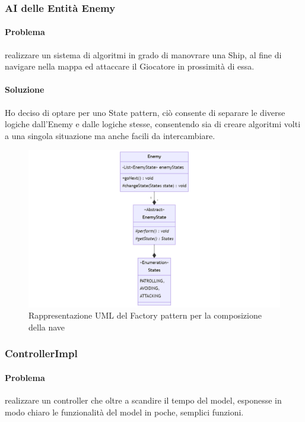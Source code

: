 \documentclass[a4paper,12pt]{report}
\begin{document}
\subsubsection*{AI delle Entità Enemy}
\paragraph{Problema} realizzare un sistema di algoritmi in grado di manovrare una Ship, al fine di navigare nella mappa ed attaccare il Giocatore in prossimità di essa.
\paragraph{Soluzione} Ho deciso di optare per uno State pattern, ciò consente di separare le diverse logiche dall'Enemy e dalle logiche stesse, consentendo sia di creare algoritmi volti a una singola situazione ma anche facili da intercambiare.

\begin{figure}[H]
	\centering{}
	\includegraphics[width=1.2\textwidth]{img/Enemy.png}
	\caption{Rappresentazione UML del Factory pattern per la composizione della nave}
	\label{img:Enemy}
\end{figure}

\subsubsection*{ControllerImpl}
\paragraph{Problema} realizzare un controller che oltre a scandire il tempo del model, esponesse in modo chiaro le funzionalità del model in poche, semplici funzioni.
\end{document}
